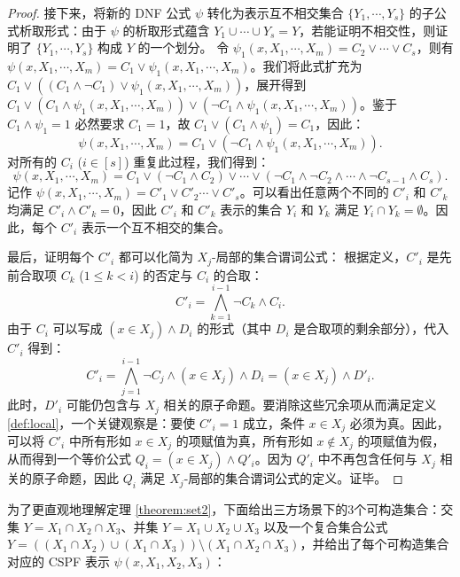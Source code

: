 \begin{proof}
接下来，将新的 DNF 公式 $\psi$ 转化为表示互不相交集合 $\{Y_1, \cdots, Y_s\}$ 的子公式析取形式：由于 $\psi$ 的析取形式蕴含 $Y_1 \cup \cdots \cup Y_s = Y$，若能证明不相交性，则证明了 $\{Y_1, \cdots, Y_s\}$ 构成 $Y$ 的一个划分。
令 $\psi_1(x, X_1, \cdots, X_m) = C_2 \lor \cdots \lor C_s$，则有 $\psi(x, X_1, \cdots, X_m) = C_1 \lor \psi_1(x, X_1, \cdots, X_m)$。我们将此式扩充为 $C_1 \lor ((C_1 \land \neg C_1) \lor \psi_1(x, X_1, \cdots, X_m))$，展开得到 $C_1 \lor (C_1 \land \psi_1(x, X_1, \cdots, X_m)) \lor (\neg C_1 \land \psi_1(x, X_1, \cdots, X_m))$。鉴于 $C_1 \land \psi_1 = 1$ 必然要求 $C_1 = 1$，故 $C_1 \lor (C_1 \land \psi_1) = C_1$，因此：
$$\psi(x, X_1, \cdots, X_m) = C_1 \lor (\neg C_1 \land \psi_1(x, X_1, \cdots, X_m)).$$
对所有的 $C_i$ ($i \in [s]$) 重复此过程，我们得到：
$$\psi(x, X_1, \cdots, X_m) = C_1 \lor (\neg C_1 \land C_2) \lor \cdots \lor (\neg C_1 \land \neg C_2 \land \cdots \land \neg C_{s-1} \land C_s).$$
记作 $\psi(x, X_1, \cdots, X_m) = C'_1 \lor C'_2 \cdots \lor C'_s$。可以看出任意两个不同的 $C'_i$ 和 $C'_k$均满足 $C'_i \land C'_k = 0$，因此 $C'_i$ 和 $C'_k$ 表示的集合 $Y_i$ 和 $Y_k$ 满足 $Y_i \cap Y_k = \emptyset$。因此，每个 $C'_i$ 表示一个互不相交的集合。

最后，证明每个 $C'_i$ 都可以化简为 $X_j$-局部的集合谓词公式：
根据定义，$C'_i$ 是先前合取项 $C_k$ ($1 \le k < i$) 的否定与 $C_i$ 的合取：
$$C'_i = \bigwedge_{k=1}^{i-1} \neg C_k \land C_i.$$
由于 $C_i$ 可以写成 $(x \in X_j) \land D_i$ 的形式（其中 $D_i$ 是合取项的剩余部分），代入 $C'_i$ 得到：
$$C'_i = \bigwedge_{j=1}^{i-1} \neg C_j \land (x \in X_j) \land D_i = (x \in X_j) \land D'_i.$$
此时，$D'_i$ 可能仍包含与 $X_j$ 相关的原子命题。要消除这些冗余项从而满足定义 \ref{def:local}，一个关键观察是：要使 $C'_i = 1$ 成立，条件 $x \in X_j$ 必须为真。因此，可以将 $C'_i$ 中所有形如 $x \in X_j$ 的项赋值为真，所有形如 $x \notin X_j$ 的项赋值为假，从而得到一个等价公式 $Q_i = (x \in X_j) \land Q'_i$。因为 $Q'_i$ 中不再包含任何与 $X_j$ 相关的原子命题，因此 $Q_i$ 满足 $X_j$-局部的集合谓词公式的定义。证毕。
\end{proof}

为了更直观地理解定理 \ref{theorem:set2}，下面给出三方场景下的3个可构造集合：交集 $Y = X_1 \cap X_2 \cap X_3$、并集 $Y = X_1 \cup X_2 \cup X_3$ 以及一个复合集合公式 $Y = ((X_1 \cap X_2) \cup (X_1 \cap X_3)) \setminus (X_1 \cap X_2 \cap X_3)$，并给出了每个可构造集合对应的 CSPF 表示 $\psi(x, X_1, X_2, X_3)$：

